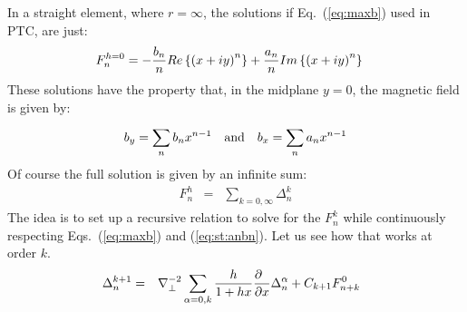 \documentclass[11pt]{article} %
\def\eq#1{Eq.~(\ref{#1})}
\def\eqs#1{Eqs.~(\ref{#1})}
\def\eqe#1{(\ref{#1})}
\begin{document}
In a straight element, where %
$r=
\infty $,
the solutions if \eq{eq:maxb} used in PTC, are just:
%
\begin{eqnarray}{F}_{n}^{h=
0}&=-{{b}_{n} \over n}Re\left\{{{\left({x+iy}\right)}^{n}}\right\}+{{a}_{n} \over n}Im\left\{{{\left({x+iy}\right)}^{n}}\right\}  \label{eq:hsol} \end{eqnarray}
%
%
These solutions have the property that, in the midplane $y=0$,  the magnetic field is given by:
%
\begin{eqnarray}{b}_{y}=
\sum\limits_{n}^{} {b}_{n}{x}^{n-1}~~~{\rm a}{\rm n}{\rm d} ~~~{b}_{x}=
\sum\limits_{n}^{} {a}_{n}{x}^{n-1} \label{eq:st:anbn}\end{eqnarray}
%
%
Of course the full solution is given by an infinite sum:
%
\begin{eqnarray}{F}_{n}^{h} &=
& \sum\limits_{k=
0,\infty }^{} {\Delta }_{n}^{k}\label{fnk}\end{eqnarray}
%
%
The idea is to set up a recursive relation to solve for the $F_n^k$ while continuously respecting \eqs{eq:maxb} and \eqe{eq:st:anbn}. Let us see how that works at order $k$. 
%
\begin{eqnarray}{\Delta }_{n}^{k+1} &=
&{\nabla }_{\perp }^{-2}\sum\limits_{\alpha =
0,k}^{} {h \over 1+hx}{\partial \hphantom{x} \over \partial x}{\Delta }_{n}^{\alpha }+{C}_{k+1}{F}_{n+k}^{0}\ \ \label{eq:sol:anbn}\end{eqnarray}
\end{document}

